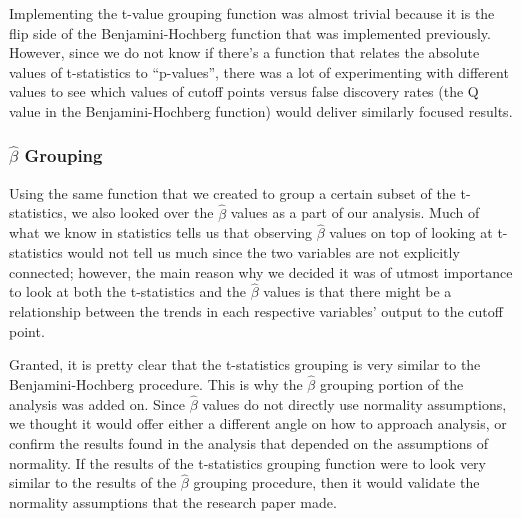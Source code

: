 \par Implementing the t-value grouping function was almost trivial because it 
is the flip side of the Benjamini-Hochberg function that was implemented 
previously. However, since we do not know if there's a function that relates 
the absolute values of t-statistics to ``p-values'', there was a lot of 
experimenting with different values to see which values of cutoff points versus
false discovery rates (the Q value in the Benjamini-Hochberg function) would 
deliver similarly focused results.

\subsubsection{$\hat{\beta}$ Grouping}

\par Using the same function that we created to group a certain subset of the 
t-statistics, we also looked over the $\hat{\beta}$ values as a part of our 
analysis. Much of what we know in statistics tells us that observing 
$\hat{\beta}$ values on top of looking at t-statistics would not tell us much 
since the two variables are not explicitly connected; however, the main reason 
why we decided it was of utmost importance to look at both the t-statistics 
and the $\hat{\beta}$ values is that there might be a relationship between the 
trends in each respective variables' output to the cutoff point. 

\par Granted, it is pretty clear that the t-statistics grouping is very similar
to the Benjamini-Hochberg procedure. This is why the $\hat{\beta}$ grouping 
portion of the analysis was added on. Since $\hat{\beta}$ values do not 
directly use normality assumptions, we thought it would offer either a 
different angle on how to approach analysis, or confirm the results found in 
the analysis that depended on the assumptions of normality. If the results of
the t-statistics grouping function were to look very similar to the results of
the $\hat{\beta}$ grouping procedure, then it would validate the normality 
assumptions that the research paper made. 